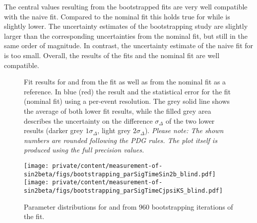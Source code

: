 The central values resulting from the bootstrapped \sPlot fits are very well
compatible with the naive \sPlot fit. Compared to the nominal fit this holds
true for \CJpsiKS while \SJpsiKS is slightly lower. The uncertainty estimates of
the bootstrapping study are slightly larger than the corresponding uncertainties
from the nominal fit, but still in the same order of magnitude. In contrast, the
uncertainty estimate of the naive \sPlot fit for \SJpsiKS is too small. Overall,
the results of the \sPlot fits and the nominal fit are well compatible.
%
\begin{figure}
\centering


\caption{
Fit results for \SJpsiKS and \CJpsiKS from the \sPlot fit as well as from the
nominal fit as a reference. In blue (red) the result and the statistical error
for the \sPlot fit (nominal fit) using a per-event resolution. The grey solid
line shows the average of both lower fit results, while the filled grey area
describes the uncertainty on the difference $\sigma_\Delta$ of the two lower
results (darker grey $1\sigma_\Delta$, light grey $2\sigma_\Delta$).
\textit{Please note: The shown numbers are rounded following the PDG rules. The
plot itself is produced using the full precision values.}}
\label{fig:measurement_of_sin2beta:systematics:cross_checks:splot_fit:s_and_c}
\end{figure}
%
\begin{figure}
\centering
\texttt{[image: private/content/measurement-of-sin2beta/figs/bootstrapping\_parSigTimeSin2b\_blind.pdf]}
\hfill
\texttt{[image: private/content/measurement-of-sin2beta/figs/bootstrapping\_parSigTimeCjpsiKS\_blind.pdf]}
\caption{
Parameter distributions for \SJpsiKS and \CJpsiKS from $\num{960}$
bootstrapping iterations of the \sPlot fit.}
\label{fig:measurement_of_sin2beta:systematics:cross_checks:splot_fit:bootstrapping}
\end{figure}


